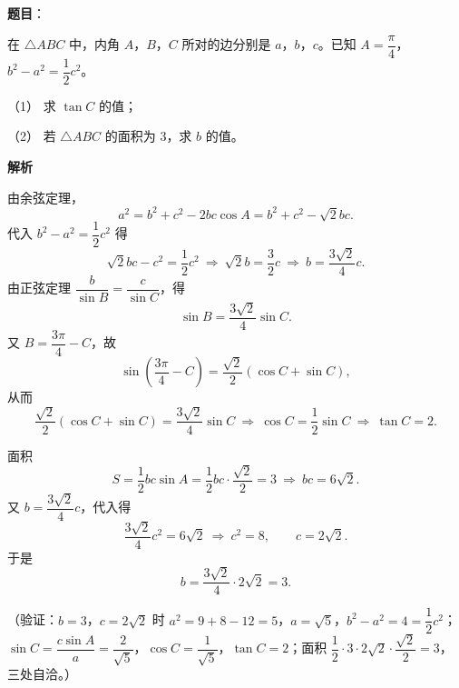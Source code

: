 \begin{answer}

\textbf{题目}：

在 \(\triangle ABC\) 中，内角 \(A\)，\(B\)，\(C\) 所对的边分别是 \(a\)，\(b\)，\(c\)。已知 \(A=\dfrac{\pi}{4}\)，\(b^2-a^2=\dfrac12c^2\)。

（1） 求 \(\tan C\) 的值；

（2） 若 \(\triangle ABC\) 的面积为 \(3\)，求 \(b\) 的值。

\textbf{解析}


由余弦定理，
\nopagebreak[4]
\[
a^2=b^2+c^2-2bc\cos A=b^2+c^2-\sqrt2bc.
\]
代入 \(b^2-a^2=\dfrac12c^2\) 得
\nopagebreak[4]
\[
\sqrt2bc-c^2=\frac12c^2
\ \Longrightarrow\ \sqrt2b=\frac32c
\ \Longrightarrow\ b=\frac{3\sqrt2}{4}c.
\]
由正弦定理 \(\dfrac{b}{\sin B}=\dfrac{c}{\sin C}\)，得
\nopagebreak[4]
\[
\sin B=\frac{3\sqrt2}{4}\sin C.
\]
又 \(B=\dfrac{3\pi}{4}-C\)，故
\nopagebreak[4]
\[
\sin\left(\frac{3\pi}{4}-C\right)=\frac{\sqrt2}{2}(\cos C+\sin C),
\]
从而
\nopagebreak[4]
\[
\frac{\sqrt2}{2}(\cos C+\sin C)=\frac{3\sqrt2}{4}\sin C
\ \Longrightarrow\ \cos C=\frac12\sin C
\ \Longrightarrow\ \tan C=2.
\]


面积
\nopagebreak[4]
\[
S=\frac12bc\sin A=\frac12bc\cdot\frac{\sqrt2}{2}=3
\ \Longrightarrow\ bc=6\sqrt2.
\]
又 \(b=\dfrac{3\sqrt2}{4}c\)，代入得
\nopagebreak[4]
\[
\frac{3\sqrt2}{4}c^2=6\sqrt2
\ \Longrightarrow\ c^2=8,\qquad c=2\sqrt2.
\]
于是
\nopagebreak[4]
\[
b=\frac{3\sqrt2}{4}\cdot2\sqrt2=3.
\]

（验证：\(b=3\)，\(c=2\sqrt2\) 时 \(a^2=9+8-12=5\)，\(a=\sqrt5\)，\(b^2-a^2=4=\dfrac12c^2\)；\(\sin C=\dfrac{c\sin A}{a}=\dfrac{2}{\sqrt5}\)，\(\cos C=\dfrac{1}{\sqrt5}\)，\(\tan C=2\)；面积 \(\dfrac12\cdot3\cdot2\sqrt2\cdot\dfrac{\sqrt2}{2}=3\)，三处自洽。）



\end{answer}
